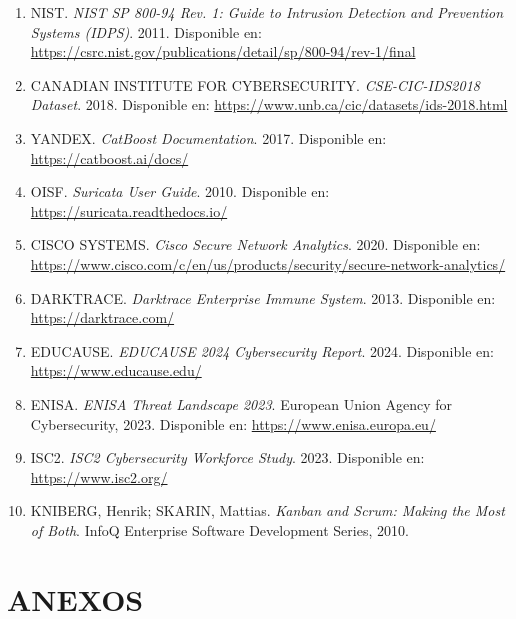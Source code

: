 \documentclass[12pt,letterpaper]{report}
\begin{document}
\begin{enumerate}[label=\arabic*., ref=\arabic*]
  \item NIST. \textit{NIST SP 800-94 Rev. 1: Guide to Intrusion Detection and Prevention Systems (IDPS)}. 2011. Disponible en: \url{https://csrc.nist.gov/publications/detail/sp/800-94/rev-1/final}
  
  \item CANADIAN INSTITUTE FOR CYBERSECURITY. \textit{CSE-CIC-IDS2018 Dataset}. 2018. Disponible en: \url{https://www.unb.ca/cic/datasets/ids-2018.html}
  
  \item YANDEX. \textit{CatBoost Documentation}. 2017. Disponible en: \url{https://catboost.ai/docs/}
  
  \item OISF. \textit{Suricata User Guide}. 2010. Disponible en: \url{https://suricata.readthedocs.io/}
  
  \item CISCO SYSTEMS. \textit{Cisco Secure Network Analytics}. 2020. Disponible en: \url{https://www.cisco.com/c/en/us/products/security/secure-network-analytics/}
  
  \item DARKTRACE. \textit{Darktrace Enterprise Immune System}. 2013. Disponible en: \url{https://darktrace.com/}
  
  \item EDUCAUSE. \textit{EDUCAUSE 2024 Cybersecurity Report}. 2024. Disponible en: \url{https://www.educause.edu/}
  
  \item ENISA. \textit{ENISA Threat Landscape 2023}. European Union Agency for Cybersecurity, 2023. Disponible en: \url{https://www.enisa.europa.eu/}
  
  \item ISC2. \textit{ISC2 Cybersecurity Workforce Study}. 2023. Disponible en: \url{https://www.isc2.org/}
  
  \item KNIBERG, Henrik; SKARIN, Mattias. \textit{Kanban and Scrum: Making the Most of Both}. InfoQ Enterprise Software Development Series, 2010.
\end{enumerate}

\appendix
\chapter{ANEXOS}
\end{document}

